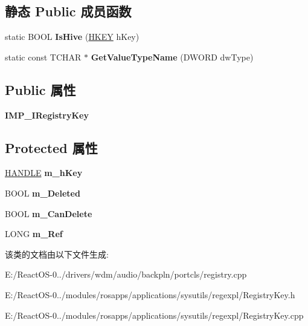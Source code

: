 \subsection*{静态 Public 成员函数}
\begin{DoxyCompactItemize}
\item 
\mbox{\label{class_c_registry_key_aa82ee4d9d87d7fb5eec0ea9c8f52382e}} 
static B\+O\+OL {\bfseries Is\+Hive} (\hyperlink{interfacevoid}{H\+K\+EY} h\+Key)
\item 
\mbox{\label{class_c_registry_key_a3ed0b647661bc0ae921de5193900bfca}} 
static const T\+C\+H\+AR $\ast$ {\bfseries Get\+Value\+Type\+Name} (D\+W\+O\+RD dw\+Type)
\end{DoxyCompactItemize}
\subsection*{Public 属性}
\begin{DoxyCompactItemize}
\item 
\mbox{\label{class_c_registry_key_aa26503e73d352f83dbe67a1cfc598864}} 
{\bfseries I\+M\+P\+\_\+\+I\+Registry\+Key}
\end{DoxyCompactItemize}
\subsection*{Protected 属性}
\begin{DoxyCompactItemize}
\item 
\mbox{\label{class_c_registry_key_ac8591f7ccdaa95608bb2cb8c68c895ca}} 
\hyperlink{interfacevoid}{H\+A\+N\+D\+LE} {\bfseries m\+\_\+h\+Key}
\item 
\mbox{\label{class_c_registry_key_a20fd25f5c7146bcd61fe531df7cdd7ba}} 
B\+O\+OL {\bfseries m\+\_\+\+Deleted}
\item 
\mbox{\label{class_c_registry_key_abb6d4836fcb0a95e85f77d403737ced0}} 
B\+O\+OL {\bfseries m\+\_\+\+Can\+Delete}
\item 
\mbox{\label{class_c_registry_key_aadf48834ab376c6a1a8942273f9bdaaf}} 
L\+O\+NG {\bfseries m\+\_\+\+Ref}
\end{DoxyCompactItemize}


该类的文档由以下文件生成\+:\begin{DoxyCompactItemize}
\item 
E\+:/\+React\+O\+S-\/0../drivers/wdm/audio/backpln/portcls/registry.\+cpp\item 
E\+:/\+React\+O\+S-\/0../modules/rosapps/applications/sysutils/regexpl/Registry\+Key.\+h\item 
E\+:/\+React\+O\+S-\/0../modules/rosapps/applications/sysutils/regexpl/Registry\+Key.\+cpp\end{DoxyCompactItemize}
